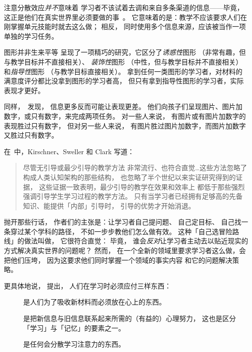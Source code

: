 注意分散效应\emph{并不}意味着
学习者不该试着去调和来自多条渠道的信息——毕竟，
这正是他们在真实世界里必须要做的事~\cite{Atki2000}。
它意味着的是：教学不应该要求人们在刚掌握单元技能时就去这么做；
相反，
同时使用多个信息来源，应该被当作一项单独的学习任务。

\begin{aside}{图形并非生来平等}
  \cite{Sung2012}呈现了一项精巧的研究，它区分了\emph{诱惑性}图形
  （非常有趣，但与教学目标并不直接相关）、
  \emph{装饰性}图形
  （中性，但与教学目标并不直接相关）
  和\emph{指导性}图形
  （与教学目标直接相关）。
  拿到任何一类图形的学习者，对材料的满意度评分都比没拿到图形的学习者高，
  但只有拿到指导性图形的学习者，实际表现才更好。

  同样，~\cite{Stam2013,Stam2014}发现，
  信息更多反而可能让表现更差。
  他们向孩子们呈现图片、图片加数字，或只有数字，来完成两项任务。
  对一些人来说，
  有图片或有图片加数字的表现胜过只有数字，
  但对另一些人来说，
  有图片胜过图片加数字，而图片加数字又胜过只有数字。
\end{aside}


在~\cite{Kirs2006}中，Kirschner、Sweller 和 Clark 写道：

\begin{quote}

  尽管无引导或最少引导的教学方法
  非常流行、也符合直觉{\ldots}这些方法忽略了
  构成人类认知架构的那些结构，
  也忽略了半个世纪以来实证研究得到的证据，
  这些证据一致表明，最少引导的教学在效果和效率上
  都低于那些强烈强调引导学生学习过程的教学方法。
  只有当学习者已经拥有足够高的先备知识、能提供「内部」引导时，
  引导的优势才开始消退。

\end{quote}

抛开那些行话，
作者们的主张是：让学习者自己提问题、
自己定目标、
自己找一条穿过某个学科的路径，
不如一步步教他们怎么做有效。
这种「自己选冒险路线」的做法叫做，
它很符合直觉：
毕竟，
谁会\emph{反对}让学习者主动去以贴近现实的方式解决真实世界的问题呢？
然而，
在一个全新的领域里要求学习者这么做，会把他们压垮，
因为这要求他们同时掌握一个领域的事实内容
和它的问题解决策略。

更具体地说，
提出，
人们在学习时必须应付三样东西：

\begin{description}

\item[]
  是人们为了吸收新材料而必须放在心上的东西。

\item[]
  是把新信息与旧信息联系起来所需的（有益的）心理努力，
  这也是区分「学习」与「记忆」的要素之一。

\item[]
  是任何会分散学习注意力的东西。

\end{description}

